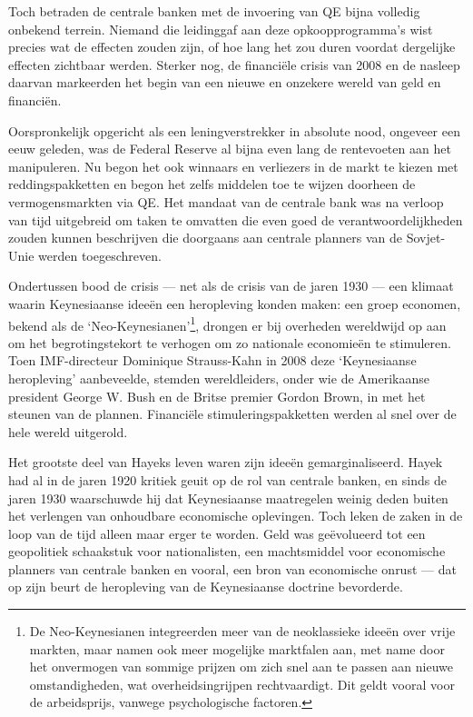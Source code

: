\documentclass[smalldemyvopaper,11pt,twoside,onecolumn,openright,extrafontsizes,hidelinks]{memoir}
\begin{document}
Toch betraden de centrale banken met de invoering van QE bijna volledig
onbekend terrein. Niemand die leidinggaf aan deze opkoopprogramma's wist
precies wat de effecten zouden zijn, of hoe lang het zou duren voordat
dergelijke effecten zichtbaar werden. Sterker nog, de financiële crisis
van 2008 en de nasleep daarvan markeerden het begin van een nieuwe en
onzekere wereld van geld en financiën.

Oorspronkelijk opgericht als een leningverstrekker in absolute nood,
ongeveer een eeuw geleden, was de Federal Reserve al bijna even lang de
rentevoeten aan het manipuleren. Nu begon het ook winnaars en verliezers
in de markt te kiezen met reddingspakketten en begon het zelfs middelen
toe te wijzen doorheen de vermogensmarkten via QE. Het mandaat van de
centrale bank was na verloop van tijd uitgebreid om taken te omvatten
die even goed de verantwoordelijkheden zouden kunnen beschrijven die
doorgaans aan centrale planners van de Sovjet-Unie werden toegeschreven.

Ondertussen bood de crisis --- net als de crisis van de jaren 1930 ---
een klimaat waarin Keynesiaanse ideeën een heropleving konden maken: een
groep economen, bekend als de `Neo-Keynesianen'\footnote{De
  Neo-Keynesianen integreerden meer van de neoklassieke ideeën over
  vrije markten, maar namen ook meer mogelijke marktfalen aan, met name
  door het onvermogen van sommige prijzen om zich snel aan te passen aan
  nieuwe omstandigheden, wat overheidsingrijpen rechtvaardigt. Dit geldt
  vooral voor de arbeidsprijs, vanwege psychologische factoren.},
drongen er bij overheden wereldwijd op aan om het begrotingstekort te
verhogen om zo nationale economieën te stimuleren. Toen IMF-directeur
Dominique Strauss-Kahn in 2008 deze `Keynesiaanse heropleving'
aanbeveelde, stemden wereldleiders, onder wie de Amerikaanse president
George W. Bush en de Britse premier Gordon Brown, in met het steunen van
de plannen. Financiële stimuleringspakketten werden al snel over de hele
wereld uitgerold.

Het grootste deel van Hayeks leven waren zijn ideeën gemarginaliseerd.
Hayek had al in de jaren 1920 kritiek geuit op de rol van centrale
banken, en sinds de jaren 1930 waarschuwde hij dat Keynesiaanse
maatregelen weinig deden buiten het verlengen van onhoudbare economische
oplevingen. Toch leken de zaken in de loop van de tijd alleen maar erger
te worden. Geld was geëvolueerd tot een geopolitiek schaakstuk voor
nationalisten, een machtsmiddel voor economische planners van centrale
banken en vooral, een bron van economische onrust --- dat op zijn beurt
de heropleving van de Keynesiaanse doctrine bevorderde.
\end{document}
